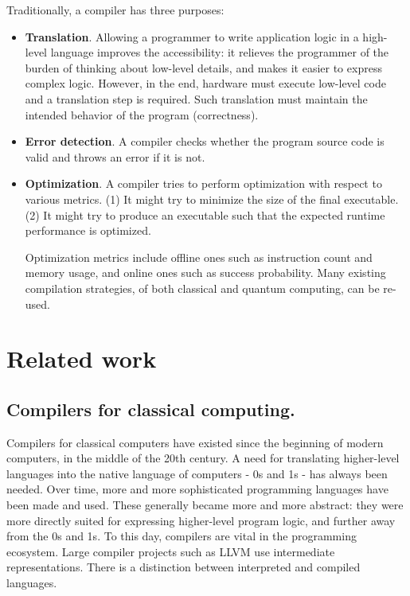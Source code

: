 Traditionally, a compiler has three purposes:

\begin{itemize}

\item \textbf{Translation}.
Allowing a programmer to write application logic in a high-level language improves the accessibility:
it relieves the programmer of the burden of thinking about low-level details, and makes it easier to express complex logic.
However, in the end, hardware must execute low-level code and a translation step is required.
Such translation must maintain the intended behavior of the program (correctness).

\item \textbf{Error detection}.
A compiler checks whether the program source code is valid and throws an error if it is not.

\item \textbf{Optimization}.
A compiler tries to perform optimization with respect to various metrics.
(1) It might try to minimize the size of the final executable.
(2) It might try to produce an executable such that the expected runtime performance is optimized.

Optimization metrics include offline ones such as instruction count and memory usage, and online ones such as success probability.
Many existing compilation strategies, of both classical and quantum computing, can be re-used.

\end{itemize}



\section{Related work}

\subsection{Compilers for classical computing.}
Compilers for classical computers have existed since the beginning of modern computers, in the middle of the 20th century. 
A need for translating higher-level languages into the native language of computers - 0s and 1s - has always been needed.
Over time, more and more sophisticated programming languages have been made and used.
These generally became more and more abstract: they were more directly suited for expressing higher-level program logic, and further away from the 0s and 1s.
To this day, compilers are vital in the programming ecosystem.
Large compiler projects such as LLVM use intermediate representations.
There is a distinction between interpreted and compiled languages.

